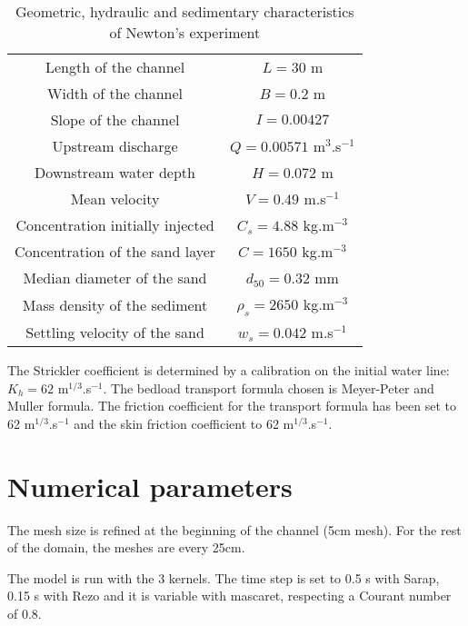 \begin{table}[H] %
   \begin{center}
   \caption{Geometric, hydraulic and sedimentary characteristics of Newton's experiment} %
       \begin{tabular}{|c|c|} %
       \hline %
   Length of the channel& $L=30$ m \\%
   Width of the channel&$ B=0.2$ m \\
   Slope of the channel& $I=0.00427$ \\
   \hline
  Upstream discharge &$Q=0.00571$ m$^{3}$.s$^{-1}$\\
  Downstream water depth &$ H=0.072$ m \\
  Mean velocity &$V=0.49$ m.s$^{-1}$ \\  
    \hline
   Concentration initially injected& $C_s=4.88$ kg.m$^{-3}$ \\
   Concentration of the sand layer& $C=1650$ kg.m$^{-3}$ \\
   Median diameter of the sand& $d_{50}=0.32$ mm \\   
   Mass density of the sediment& $\rho_s = 2650$ kg.m$^{-3}$\\
   Settling velocity of the sand& $w_s=0.042$ m.s$^{-1}$\\
  \hline
        \end{tabular}
     \end{center}
\end{table}

The Strickler coefficient is determined by a calibration on the
initial water line: $K_h = 62$ m$^{1/3}$.s$^{-1}$. 
The bedload transport formula chosen is Meyer-Peter and Muller
formula.
The friction 
coefficient for the transport formula has been set to 62 
m$^{1/3}$.s$^{-1}$ and the skin friction coefficient to 62
m$^{1/3}$.s$^{-1}$.

\section{Numerical parameters}

The mesh size is refined at the beginning of the channel (5cm mesh). 
For the rest of the domain, the meshes are every 25cm.

The model is run with the 3 kernels. The time step is set to 0.5 s with 
Sarap, 0.15 s with Rezo and it is variable with mascaret, respecting 
a Courant number of 0.8.

